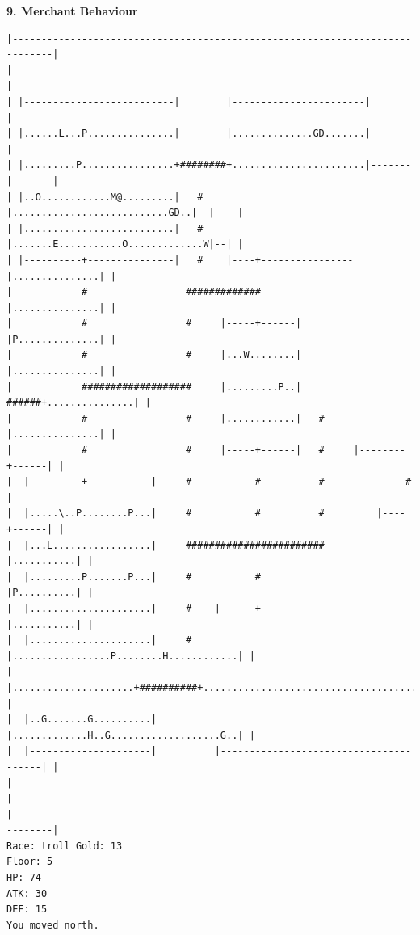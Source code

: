 \documentclass[11pt]{article}
\theoremstyle{plain}
\begin{document}
\newpage
\textbf{9. Merchant Behaviour}

\begin{Verbatim}[fontsize=\scriptsize]
|-----------------------------------------------------------------------------|
|                                                                             |
| |--------------------------|        |-----------------------|               |
| |......L...P...............|        |..............GD.......|               |
| |.........P................+########+.......................|-------|       |
| |..O............M@.........|   #    |...........................GD..|--|    |
| |..........................|   #    |.......E...........O.............W|--| |
| |----------+---------------|   #    |----+----------------|...............| |
|            #                 #############                |...............| |
|            #                 #     |-----+------|         |P..............| |
|            #                 #     |...W........|         |...............| |
|            ###################     |.........P..|   ######+...............| |
|            #                 #     |............|   #     |...............| |
|            #                 #     |-----+------|   #     |--------+------| |
|  |---------+-----------|     #           #          #              #        |
|  |.....\..P........P...|     #           #          #         |----+------| |
|  |...L.................|     ########################         |...........| |
|  |.........P.......P...|     #           #                    |P..........| |
|  |.....................|     #    |------+--------------------|...........| |
|  |.....................|     #    |.................P........H............| |
|  |.....................+##########+.......................................| |
|  |..G.......G..........|          |.............H..G...................G..| |
|  |---------------------|          |---------------------------------------| |
|                                                                             |
|-----------------------------------------------------------------------------|
Race: troll Gold: 13                                                   Floor: 5
HP: 74
ATK: 30
DEF: 15
You moved north.
\end{Verbatim}
\end{document}
